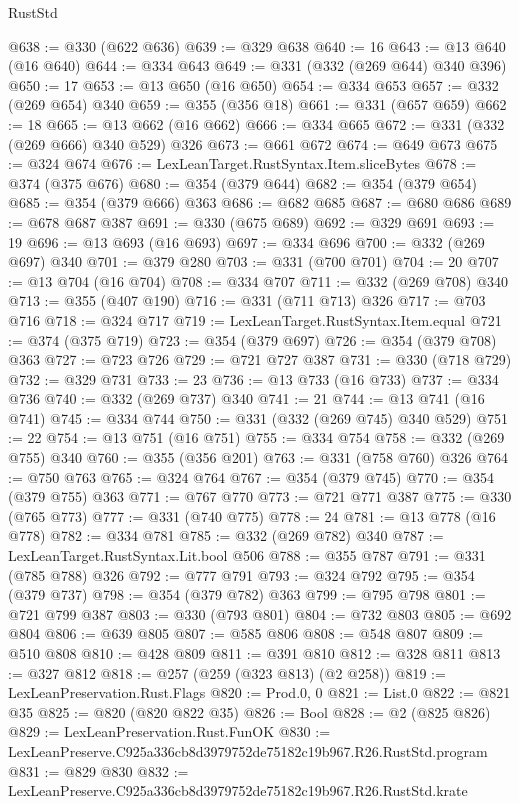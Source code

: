 \begin{lexlean}{RustStd}
\begin{coremodule}
@638 := @330 (@622 @636)
@639 := @329 @638
@640 := 16
@643 := @13 @640 (@16 @640)
@644 := @334 @643
@649 := @331 (@332 (@269 @644) @340 @396)
@650 := 17
@653 := @13 @650 (@16 @650)
@654 := @334 @653
@657 := @332 (@269 @654) @340
@659 := @355 (@356 @18)
@661 := @331 (@657 @659)
@662 := 18
@665 := @13 @662 (@16 @662)
@666 := @334 @665
@672 := @331 (@332 (@269 @666) @340 @529) @326
@673 := @661 @672
@674 := @649 @673
@675 := @324 @674
@676 := LexLeanTarget.RustSyntax.Item.sliceBytes
@678 := @374 (@375 @676)
@680 := @354 (@379 @644)
@682 := @354 (@379 @654)
@685 := @354 (@379 @666) @363
@686 := @682 @685
@687 := @680 @686
@689 := @678 @687 @387
@691 := @330 (@675 @689)
@692 := @329 @691
@693 := 19
@696 := @13 @693 (@16 @693)
@697 := @334 @696
@700 := @332 (@269 @697) @340
@701 := @379 @280
@703 := @331 (@700 @701)
@704 := 20
@707 := @13 @704 (@16 @704)
@708 := @334 @707
@711 := @332 (@269 @708) @340
@713 := @355 (@407 @190)
@716 := @331 (@711 @713) @326
@717 := @703 @716
@718 := @324 @717
@719 := LexLeanTarget.RustSyntax.Item.equal
@721 := @374 (@375 @719)
@723 := @354 (@379 @697)
@726 := @354 (@379 @708) @363
@727 := @723 @726
@729 := @721 @727 @387
@731 := @330 (@718 @729)
@732 := @329 @731
@733 := 23
@736 := @13 @733 (@16 @733)
@737 := @334 @736
@740 := @332 (@269 @737) @340
@741 := 21
@744 := @13 @741 (@16 @741)
@745 := @334 @744
@750 := @331 (@332 (@269 @745) @340 @529)
@751 := 22
@754 := @13 @751 (@16 @751)
@755 := @334 @754
@758 := @332 (@269 @755) @340
@760 := @355 (@356 @201)
@763 := @331 (@758 @760) @326
@764 := @750 @763
@765 := @324 @764
@767 := @354 (@379 @745)
@770 := @354 (@379 @755) @363
@771 := @767 @770
@773 := @721 @771 @387
@775 := @330 (@765 @773)
@777 := @331 (@740 @775)
@778 := 24
@781 := @13 @778 (@16 @778)
@782 := @334 @781
@785 := @332 (@269 @782) @340
@787 := LexLeanTarget.RustSyntax.Lit.bool @506
@788 := @355 @787
@791 := @331 (@785 @788) @326
@792 := @777 @791
@793 := @324 @792
@795 := @354 (@379 @737)
@798 := @354 (@379 @782) @363
@799 := @795 @798
@801 := @721 @799 @387
@803 := @330 (@793 @801)
@804 := @732 @803
@805 := @692 @804
@806 := @639 @805
@807 := @585 @806
@808 := @548 @807
@809 := @510 @808
@810 := @428 @809
@811 := @391 @810
@812 := @328 @811
@813 := @327 @812
@818 := @257 (@259 (@323 @813) (@2 @258))
@819 := LexLeanPreservation.Rust.Flags
@820 := Prod.{0, 0}
@821 := List.{0}
@822 := @821 @35
@825 := @820 (@820 @822 @35)
@826 := Bool
@828 := @2 (@825 @826)
@829 := LexLeanPreservation.Rust.FunOK
@830 := LexLeanPreserve.C925a336cb8d3979752de75182c19b967.R26.RustStd.program
@831 := @829 @830
@832 := LexLeanPreserve.C925a336cb8d3979752de75182c19b967.R26.RustStd.krate

\end{coremodule}
\end{lexlean}
